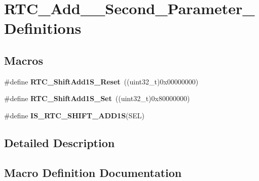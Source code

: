 \hypertarget{group___r_t_c___add__1___second___parameter___definitions}{}\section{R\+T\+C\+\_\+\+Add\+\_\+\_\+\+Second\+\_\+\+Parameter\+\_\+\+Definitions}
\label{group___r_t_c___add__1___second___parameter___definitions}
\subsection*{Macros}
\begin{DoxyCompactItemize}
\item 
\hypertarget{group___r_t_c___add__1___second___parameter___definitions_ga8b202b701dc12f88a628345b40146f78}{}\#define {\bfseries R\+T\+C\+\_\+\+Shift\+Add1\+S\+\_\+\+Reset}~((uint32\+\_\+t)0x00000000)\label{group___r_t_c___add__1___second___parameter___definitions_ga8b202b701dc12f88a628345b40146f78}

\item 
\hypertarget{group___r_t_c___add__1___second___parameter___definitions_gafcf0fac6c5dafc3d1cd3c9ce6ec196be}{}\#define {\bfseries R\+T\+C\+\_\+\+Shift\+Add1\+S\+\_\+\+Set}~((uint32\+\_\+t)0x80000000)\label{group___r_t_c___add__1___second___parameter___definitions_gafcf0fac6c5dafc3d1cd3c9ce6ec196be}

\item 
\#define {\bfseries I\+S\+\_\+\+R\+T\+C\+\_\+\+S\+H\+I\+F\+T\+\_\+\+A\+D\+D1\+S}(S\+E\+L)
\end{DoxyCompactItemize}


\subsection{Detailed Description}


\subsection{Macro Definition Documentation}
\hypertarget{group___r_t_c___add__1___second___parameter___definitions_ga26df4ba48afac04a9798cb24bb0a5823}{}
